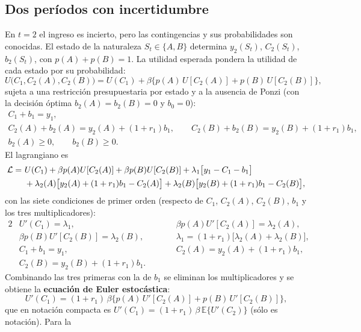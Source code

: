 \documentclass[11pt]{article}
\theoremstyle{definition}
\newcommand{\E}{\mathbb{E}}
\begin{document}
\subsection{Dos períodos con incertidumbre}

En $t=2$ el ingreso es incierto, pero las contingencias y sus probabilidades son conocidas. El estado
de la naturaleza $S_{t}\in\{A,B\}$ determina $y_{2}(S_{t})$, $C_{2}(S_{t})$, $b_{2}(S_{t})$, con
$p(A)+p(B)=1$. La utilidad esperada pondera la utilidad de cada estado por su probabilidad:
\begin{equation}
U\big(C_{1},C_{2}(A),C_{2}(B)\big)
=U(C_{1})+\beta\big\{p(A)\,U[C_{2}(A)]+p(B)\,U[C_{2}(B)]\big\},
\end{equation}
sujeta a una restricción presupuestaria por estado y a la ausencia de Ponzi (con la decisión óptima
$b_{2}(A)=b_{2}(B)=0$ y $b_{0}=0$):
\begin{gather}
C_{1}+b_{1}=y_{1},\\
C_{2}(A)+b_{2}(A)=y_{2}(A)+(1+r_{1})b_{1},\qquad
C_{2}(B)+b_{2}(B)=y_{2}(B)+(1+r_{1})b_{1},\\
b_{2}(A)\ge0,\qquad b_{2}(B)\ge0 .
\end{gather}
El lagrangiano es
\begin{align}
\mathcal{L}=\ &U(C_{1})+\beta p(A)U[C_{2}(A)]+\beta p(B)U[C_{2}(B)]
+\lambda_{1}\big[y_{1}-C_{1}-b_{1}\big] \notag\\
&+\lambda_{2}(A)\big[y_{2}(A)+(1+r_{1})b_{1}-C_{2}(A)\big]
+\lambda_{2}(B)\big[y_{2}(B)+(1+r_{1})b_{1}-C_{2}(B)\big],
\end{align}
con las siete condiciones de primer orden (respecto de $C_{1}$, $C_{2}(A)$, $C_{2}(B)$, $b_{1}$ y los
tres multiplicadores):
\begin{alignat}{2}
& U'(C_{1})=\lambda_{1}, &\qquad& \beta p(A)U'[C_{2}(A)]=\lambda_{2}(A),\\
& \beta p(B)U'[C_{2}(B)]=\lambda_{2}(B), &\qquad& \lambda_{1}=(1+r_{1})\big[\lambda_{2}(A)+\lambda_{2}(B)\big],\\
& C_{1}+b_{1}=y_{1}, &\qquad& C_{2}(A)=y_{2}(A)+(1+r_{1})b_{1},\\
& C_{2}(B)=y_{2}(B)+(1+r_{1})b_{1}. & &
\end{alignat}
Combinando las tres primeras con la de $b_{1}$ se eliminan los multiplicadores y se obtiene la
\textbf{ecuación de Euler estocástica}:
\begin{equation}
U'(C_{1})=(1+r_{1})\,\beta\big\{p(A)\,U'[C_{2}(A)]+p(B)\,U'[C_{2}(B)]\big\},
\end{equation}
que en notación compacta es $U'(C_{1})=(1+r_{1})\,\beta\,\E\{U'(C_{2})\}$ (sólo es notación). Para la
\end{document}
